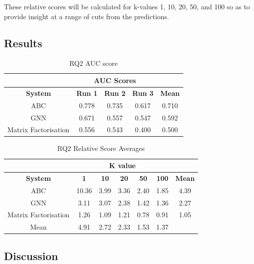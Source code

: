 \documentclass{l4proj}
\begin{document}
These relative scores will be calculated for k-values 1, 10, 20, 50, and 100 so as to provide insight at a range of cuts from the predictions. \\

\subsection{Results}

\begin{table}[h]
    \centering
    \caption{RQ2 AUC score}
    \label{tab:rq2_auc}
    \begin{tabular}{|c|c|c|c|c|}
    \hline
    & \multicolumn{3}{|c|}{AUC Scores} & \\ \hline
    \textbf{System} & \textbf{Run 1} & \textbf{Run 2} & \textbf{Run 3} & \textbf{Mean}\\ \hline
    ABC & 0.778 & 0.735 & 0.617 & 0.710 \\ \hline
    GNN & 0.671 & 0.557 & 0.547 & 0.592 \\ \hline
    Matrix Factorisation & 0.556 & 0.543 & 0.400 & 0.500 \\ \hline
    \end{tabular}
\end{table}

\begin{table}[h]
    \centering
    \caption{RQ2 Relative Score Averages}
    \label{tab:rq2_rsa}
    \begin{tabular}{|c|c|c|c|c|c|c|}
    \hline
    & \multicolumn{5}{|c|}{K value} & \\ \hline
    \textbf{System} & \textbf{1} & \textbf{10} & \textbf{20} & \textbf{50} & \textbf{100} & \textbf{Mean}\\ \hline
    ABC & 10.36 & 3.99 & 3.36 & 2.40 & 1.85 & 4.39\\ \hline
    GNN & 3.11 & 3.07 & 2.38 & 1.42 & 1.36 & 2.27\\ \hline
    Matrix Factorisation & 1.26 & 1.09 & 1.21 & 0.78 & 0.91 & 1.05\\ \hline
    Mean & 4.91 & 2.72 & 2.33 & 1.53 & 1.37 & \\ \hline
    \end{tabular}
\end{table}

\subsection{Discussion}
\end{document}
